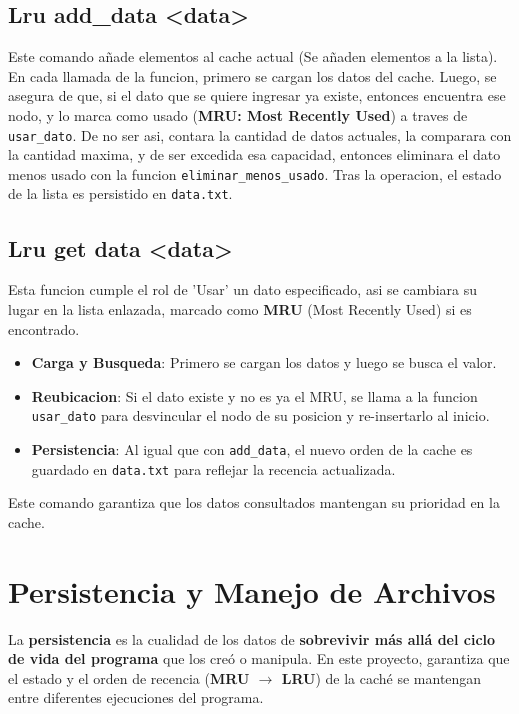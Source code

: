     \subsection{Lru add\_data \textless data\textgreater} 
    Este comando añade elementos al cache actual (Se añaden elementos a la lista). En cada llamada de la funcion, primero se cargan los datos del cache. 
    Luego, se asegura de que, si el dato que se quiere ingresar ya existe, entonces encuentra ese nodo, y lo marca como usado (\textbf{MRU: Most Recently Used}) a traves de \texttt{usar\_dato}. 
    De no ser asi, contara la cantidad de datos actuales, la comparara con la cantidad maxima, y de ser excedida esa capacidad, entonces eliminara el dato menos usado 
    con la funcion \texttt{eliminar\_menos\_usado}. Tras la operacion, el estado de la lista es persistido en \texttt{data.txt}.

    \subsection{Lru get data \textless data\textgreater}
    Esta funcion cumple el rol de 'Usar' un dato especificado, asi se cambiara su lugar en la lista enlazada, marcado como \textbf{MRU} (Most Recently Used) si es encontrado. 
    \begin{itemize}
        \item \textbf{Carga y Busqueda}: Primero se cargan los datos y luego se busca el valor.
        \item \textbf{Reubicacion}: Si el dato existe y no es ya el MRU, se llama a la funcion \texttt{usar\_dato} para desvincular el nodo de su posicion y re-insertarlo al inicio.
        \item \textbf{Persistencia}: Al igual que con \texttt{add\_data}, el nuevo orden de la cache es guardado en \texttt{data.txt} para reflejar la recencia actualizada.
    \end{itemize}
    Este comando garantiza que los datos consultados mantengan su prioridad en la cache.
\newpage
\section{Persistencia y Manejo de Archivos}
    La \textbf{persistencia} es la cualidad de los datos de \textbf{sobrevivir más allá del ciclo de vida del programa} que los creó o manipula. En este proyecto, 
    garantiza que el estado y el orden de recencia (\textbf{MRU $\rightarrow$ LRU}) de la caché se mantengan entre diferentes ejecuciones del programa.
